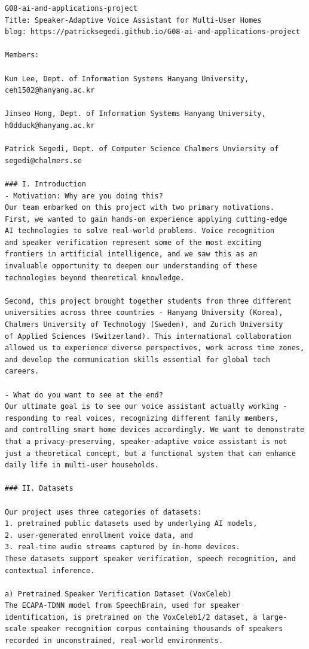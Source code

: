 \documentclass[conference]{IEEEtran}
\begin{document}
\begin{lstlisting}
G08-ai-and-applications-project
Title: Speaker-Adaptive Voice Assistant for Multi-User Homes
blog: https://patricksegedi.github.io/G08-ai-and-applications-project

Members: 

Kun Lee, Dept. of Information Systems Hanyang University, ceh1502@hanyang.ac.kr

Jinseo Hong, Dept. of Information Systems Hanyang University, h0dduck@hanyang.ac.kr

Patrick Segedi, Dept. of Computer Science Chalmers Unviersity of segedi@chalmers.se

### I. Introduction
- Motivation: Why are you doing this?
Our team embarked on this project with two primary motivations. 
First, we wanted to gain hands-on experience applying cutting-edge 
AI technologies to solve real-world problems. Voice recognition 
and speaker verification represent some of the most exciting 
frontiers in artificial intelligence, and we saw this as an 
invaluable opportunity to deepen our understanding of these 
technologies beyond theoretical knowledge.

Second, this project brought together students from three different 
universities across three countries - Hanyang University (Korea), 
Chalmers University of Technology (Sweden), and Zurich University 
of Applied Sciences (Switzerland). This international collaboration 
allowed us to experience diverse perspectives, work across time zones, 
and develop the communication skills essential for global tech careers.

- What do you want to see at the end?
Our ultimate goal is to see our voice assistant actually working - 
responding to real voices, recognizing different family members, 
and controlling smart home devices accordingly. We want to demonstrate 
that a privacy-preserving, speaker-adaptive voice assistant is not 
just a theoretical concept, but a functional system that can enhance 
daily life in multi-user households.

### II. Datasets

Our project uses three categories of datasets:
1. pretrained public datasets used by underlying AI models,
2. user-generated enrollment voice data, and
3. real-time audio streams captured by in-home devices.
These datasets support speaker verification, speech recognition, and contextual inference. 

a) Pretrained Speaker Verification Dataset (VoxCeleb)
The ECAPA-TDNN model from SpeechBrain, used for speaker identification, is pretrained on the VoxCeleb1/2 dataset, a large-scale speaker recognition corpus containing thousands of speakers recorded in unconstrained, real-world environments.


\end{lstlisting}
\end{document}
